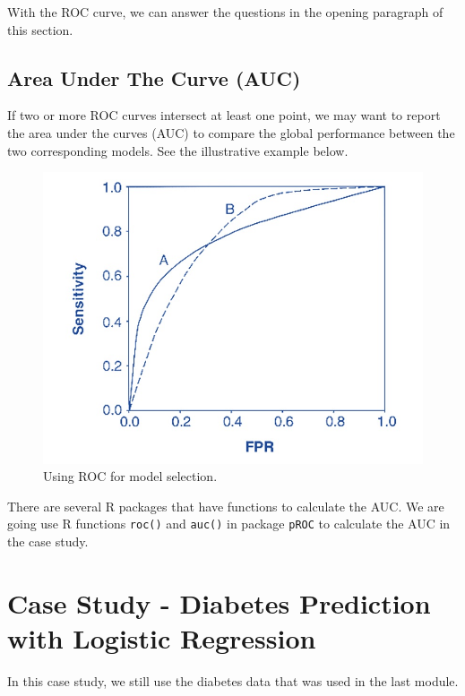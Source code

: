 \documentclass[
]{book}
\begin{document}
With the ROC curve, we can answer the questions in the opening paragraph of this section.

\hypertarget{area-under-the-curve-auc}{%
\subsection{Area Under The Curve (AUC)}\label{area-under-the-curve-auc}}

If two or more ROC curves intersect at least one point, we may want to report the area under the curves (AUC) to compare the global performance between the two corresponding models. See the illustrative example below.

\begin{figure}

{\centering \includegraphics[width=0.8\linewidth]{img08/w08-Equal-AUC-ROC} 

}

\caption{Using ROC for model selection.}\label{fig:unnamed-chunk-144}
\end{figure}

There are several R packages that have functions to calculate the AUC. We are going use R functions \texttt{roc()} and \texttt{auc()} in package \texttt{pROC} to calculate the AUC in the case study.

\hypertarget{case-study---diabetes-prediction-with-logistic-regression}{%
\section{Case Study - Diabetes Prediction with Logistic Regression}\label{case-study---diabetes-prediction-with-logistic-regression}}

In this case study, we still use the diabetes data that was used in the last module.
\end{document}
